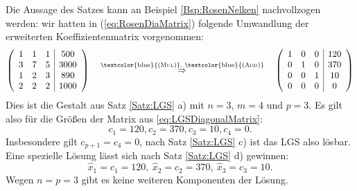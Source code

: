 \documentclass[a4paper,11pt,oneside]{article}
\theoremstyle{definition}
\def\OP#1{\textcolor{blue}{(\textnormal{\textrm{\textsc{#1}})}}}
\begin{document}
Die Aussage des Satzes kann an Beispiel \ref{Bsp:RosenNelken} nachvollzogen werden: wir hatten in (\ref{eq:RosenDiaMatrix}) folgende Umwandlung der erweiterten Koeffizientenmatrix vorgenommen:
\[
\left(\begin{array}{ccc|c}
1&1&1&500\\
3&7&5&3000\\
1&2&3&890\\
2&2&2&1000
\end{array}\right)
\quad\stackrel{\text{\OP{Mul}, \OP{Add}}}{\Rightarrow}\quad
\left(\begin{array}{ccc|c}
1&0&0&120\\
0&1&0&370\\
0&0&1&10\\
0&0&0&0
\end{array}\right)
\]
Dies ist die Gestalt aus Satz \ref{Satz:LGS} a) mit $n=3$, $m=4$ und $p=3$. Es gilt also für die Größen der Matrix aus \eqref{eq:LGSDiagonalMatrix}:
\[
c_1=120, c_2=370, c_3=10, c_4=0.
\]
Insbesondere gilt $c_{p+1}=c_4=0$, nach Satz \ref{Satz:LGS} c) ist das LGS also lösbar. Eine spezielle Lösung lässt sich nach Satz \ref{Satz:LGS} d) gewinnen:
\[
\hat{x}_1=c_1=120, \ \hat{x}_2=c_2=370,\  \hat{x}_3=c_3=10.
\]
Wegen $n=p=3$ gibt es keine weiteren Komponenten der Lösung.
\end{document}
